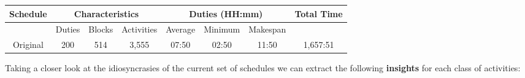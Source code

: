 
\begin{table}[t]
\small
    \centering 
    \begin{tabular}{|c|c|c|c|c|c|c|c|}
        \hline
        \textbf{Schedule} & \multicolumn{3}{|c|}{ \textbf{Characteristics}} & \multicolumn{3}{|c|}{ \textbf{Duties (HH:mm)}} & \textbf{Total Time}  \\
        \hline
        & Duties & Blocks & Activities & Average &  Minimum & Makespan & \\
        \hline
        Original & 200 & 514 & 3,555 & 07:50 & 02:50 & 11:50 & 1,657:51 \\
        \hline
    \end{tabular}%
    \medbreak
\end{table}

\vspace{\baselineskip}
\noindent
Taking a closer look at the idiosyncrasies of the current set of schedules we can extract the following \textbf{insights} for each class of activities:

\vspace{\baselineskip}


